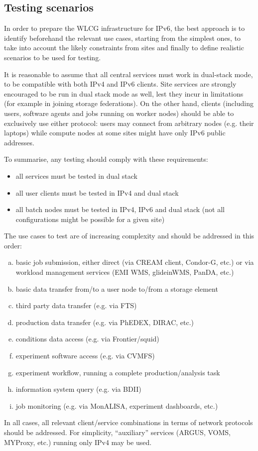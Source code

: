 \subsection{Testing scenarios}
In order to prepare the WLCG infrastructure for IPv6, the best
approach is to identify beforehand the relevant use cases, starting
from the simplest ones, to take into account the likely constraints
from sites and finally to define realistic scenarios to be used for
testing.

It is reasonable to assume that all central services must work in
dual-stack mode, to be compatible with both IPv4 and IPv6
clients. Site services are strongly encouraged to be run in dual stack
mode as well, lest they incur in limitations (for example in joining
storage federations). On the other hand, clients (including users,
software agents and jobs running on worker nodes) should be able to
exclusively use either protocol: users may connect from arbitrary
nodes (e.g. their laptops) while compute nodes at some sites might have
only IPv6 public addresses.

To summarise, any testing should comply with these requirements:
\begin{itemize}
\item all services must be tested in dual stack
\item all user clients must be tested in IPv4 and dual stack
\item all batch nodes must be tested in IPv4, IPv6 and dual stack (not all configurations might be possible for a given site)
\end{itemize}

The use cases to test are of increasing complexity and should be addressed in this order:
\begin{enumerate}[a.]
\item basic job submission, either direct (via CREAM client, Condor-G, etc.) or via workload management services (EMI WMS, glideinWMS, PanDA, etc.)
\item basic data transfer from/to a user node to/from a storage element
\item third party data transfer (e.g. via FTS)
\item production data transfer (e.g. via PhEDEX, DIRAC, etc.)
\item conditions data access (e.g. via Frontier/squid)
\item experiment software access (e.g. via CVMFS)
\item experiment workflow, running a complete production/analysis task
\item information system query (e.g. via BDII)
\item job monitoring (e.g. via MonALISA, experiment dashboards, etc.)
\end{enumerate}
In all cases, all relevant client/service combinations in terms of network protocols should be addressed. For simplicity, ``auxiliary'' services (ARGUS, VOMS, MYProxy, etc.) running only IPv4 may be used.


